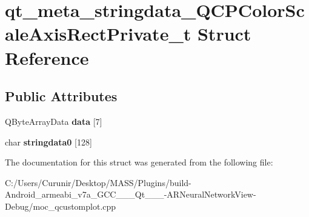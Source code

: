 \hypertarget{structqt__meta__stringdata___q_c_p_color_scale_axis_rect_private__t}{}\section{qt\+\_\+meta\+\_\+stringdata\+\_\+\+Q\+C\+P\+Color\+Scale\+Axis\+Rect\+Private\+\_\+t Struct Reference}
\label{structqt__meta__stringdata___q_c_p_color_scale_axis_rect_private__t}
\subsection*{Public Attributes}
\begin{DoxyCompactItemize}
\item 
\mbox{\label{structqt__meta__stringdata___q_c_p_color_scale_axis_rect_private__t_a7af1330a160fd63c7871f39e801f68b2}} 
Q\+Byte\+Array\+Data {\bfseries data} \mbox{[}7\mbox{]}
\item 
\mbox{\label{structqt__meta__stringdata___q_c_p_color_scale_axis_rect_private__t_aea3e1a0680408e2135ff33931690106a}} 
char {\bfseries stringdata0} \mbox{[}128\mbox{]}
\end{DoxyCompactItemize}


The documentation for this struct was generated from the following file\+:\begin{DoxyCompactItemize}
\item 
C\+:/\+Users/\+Curunir/\+Desktop/\+M\+A\+S\+S/\+Plugins/build-\/\+Android\+\_\+armeabi\+\_\+v7a\+\_\+\+G\+C\+C\+\_\+\_\+\_\+\+Qt\+\_\+\_\+\_-\/\+A\+R\+Neural\+Network\+View-\/\+Debug/moc\+\_\+qcustomplot.\+cpp\end{DoxyCompactItemize}
